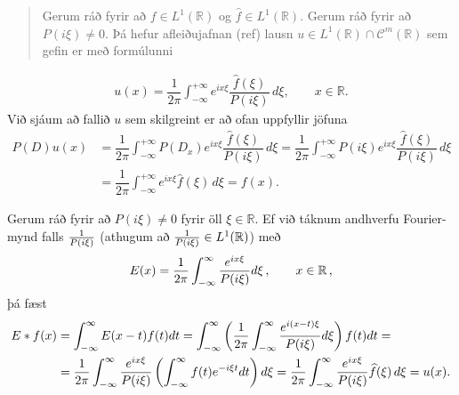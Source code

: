 \documentclass[a4paper,10pt,icelandic]{sphinxmanual}
\begin{document}
\begin{quote}

Gerum ráð fyrir að \(f\in L^1(\mathbb R)\) og \(\widehat{f}\in L^1(\mathbb R)\).
Gerum ráð fyrir að \(P(i\xi)\neq 0\). Þá hefur afleiðujafnan (ref) lausn \(u\in L^1(\mathbb R)\cap \mathcal{C}^m (\mathbb R)\) sem gefin er með formúlunni
\end{quote}
\begin{equation*}
\begin{split}u(x)=\dfrac 1{2\pi}\int_{-\infty}^ {+\infty}
e^{ix\xi} \dfrac{\widehat f(\xi)}{P(i\xi)}\, d\xi, \qquad x\in {{\mathbb  R}}.\end{split}
\end{equation*}
Við sjáum að fallið \(u\) sem skilgreint er að ofan uppfyllir jöfuna
\begin{equation*}
\begin{split}P(D)u(x)&=\dfrac 1{2\pi}\int_{-\infty}^{+\infty}P(D_x)e^{ix\xi}
\dfrac{\widehat f(\xi)}{P(i\xi)}\, d\xi=
\dfrac 1{2\pi}\int_{-\infty}^{+\infty}P(i\xi)e^{ix\xi}
\dfrac{\widehat f(\xi)}{P(i\xi)}\, d\xi\\
&= \dfrac 1{2\pi}\int_{-\infty}^{+\infty}e^{ix\xi}
\widehat f(\xi)\, d\xi=f(x).\end{split}
\end{equation*}

Gerum ráð fyrir að \(P(i\xi)\neq 0\) fyrir öll \(\xi\in\mathbb R\).
Ef við táknum andhverfu Fourier-mynd falls \({1\over P(i\xi)}\) (athugum að \({1\over P(i\xi)} \in L^1(\mathbb{R})\)) með
\begin{equation*}
\begin{split}E(x)= {1\over 2\pi} \int_{-\infty}^{\infty} {e^{i x \xi}\over P(i\xi)} d\xi\,, \qquad x\in\mathbb R\,,\end{split}
\end{equation*}
þá fæst
\begin{equation*}
\begin{split}E\ast f(x) &= \int_{-\infty}^{\infty} E(x-t) f(t)dt= \int_{-\infty}^{\infty}\left({1\over 2\pi} \int_{-\infty}^{\infty} {e^{i (x-t) \xi}\over P(i\xi)} d\xi\right)f(t) dt=\\
&={1\over 2\pi}\int_{-\infty}^{\infty}{e^{i x \xi}\over P(i\xi)}\left(\int_{-\infty}^\infty f(t) e^{-i \xi t} dt\right)d\xi= {1\over 2\pi}\int_{-\infty}^{\infty}{e^{ix\xi}\over P(i \xi)}\widehat f(\xi)\, d\xi =u(x).\end{split}
\end{equation*}
\end{document}
